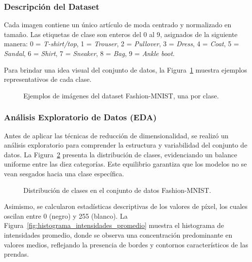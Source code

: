 \documentclass[conference]{IEEEtran}
\begin{document}
\subsubsection{Descripción del Dataset}
Cada imagen contiene un único artículo de moda centrado y normalizado en tamaño. Las etiquetas de clase son enteros del 0 al 9, asignados de la siguiente manera:  
0 = \textit{T-shirt/top},  
1 = \textit{Trouser},  
2 = \textit{Pullover},  
3 = \textit{Dress},  
4 = \textit{Coat},  
5 = \textit{Sandal},  
6 = \textit{Shirt},  
7 = \textit{Sneaker},  
8 = \textit{Bag},  
9 = \textit{Ankle boot}.

Para brindar una idea visual del conjunto de datos, la Figura~\ref{fig:mi-svg} muestra ejemplos representativos de cada clase.


\begin{figure}[H]
    \centering
    
    \caption{Ejemplos de imágenes del dataset Fashion-MNIST, una por clase.}
    \label{fig:mi-svg}
\end{figure}



\subsubsection{Análisis Exploratorio de Datos (EDA)}
Antes de aplicar las técnicas de reducción de dimensionalidad, se realizó un análisis exploratorio para comprender la estructura y variabilidad del conjunto de datos. La Figura~\ref{fig:class_distribution} presenta la distribución de clases, evidenciando un balance uniforme entre las diez categorías. Este equilibrio garantiza que los modelos no se vean sesgados hacia una clase específica.

\begin{figure}[H]
    \centering
    
    \caption{Distribución de clases en el conjunto de datos Fashion-MNIST.}
    \label{fig:class_distribution}
\end{figure}


Asimismo, se calcularon estadísticas descriptivas de los valores de píxel, los cuales oscilan entre 0 (negro) y 255 (blanco). La Figura~\ref{fig:histograma_intensidades_promedio} muestra el histograma de intensidades promedio, donde se observa una concentración predominante en valores medios, reflejando la presencia de bordes y contornos característicos de las prendas.
\end{document}
